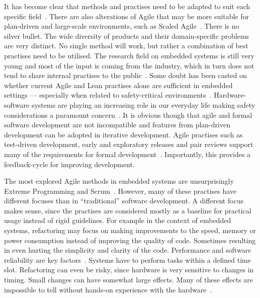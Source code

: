 \documentclass[english]{tktltiki2}
\begin{document}
It has become clear that methods and practises need to be adapted to suit each specific field~\cite{VB09, CWR10, HMP12, JLP12, KRM13}. There are also alterations of Agile that may be more suitable for plan-driven and large-scale environments, such as Scaled Agile~\cite{ScaledAgile}. There is no silver bullet. The wide diversity of products and their domain-specific problems are very distinct. No single method will work, but rather a combination of best practises need to be utilised. The research field on embedded systems is still very young and most of the input is coming from the industry, which in turn does not tend to share internal practises to the public~\cite{KRM13}. Some doubt has been casted on whether current Agile and Lean practises alone are sufficient in embedded settings — especially when related to safety-critical environments~\cite{TFR02, EB12}. Hardware-software systems are playing an increasing role in our everyday life making safety considerations a paramount concern~\cite{CWR10}. It is obvious though that agile and formal software development are not incompatible and features from plan-driven development can be adopted in iterative development. Agile practises such as test-driven development, early and exploratory releases and pair reviews support many of the requirements for formal development~\cite{TFR02, VB09, CWR10, JLP12}. Importantly, this provides a feedback-cycle for improving development.

The most explored Agile methods in embedded systems are unsurprisingly Extreme Programming and Scrum~\cite{KRM13}. However, many of these practises have different focuses than in “traditional” software development. A different focus makes sense, since the practises are considered mostly as a baseline for practical usage instead of rigid guidelines. For example in the context of embedded systems, refactoring may focus on making improvements to the speed, memory or power consumption instead of improving the quality of code. Sometimes resulting in even hurting the simplicity and clarity of the code. Performance and software reliability are key factors~\cite{RA03, EHS14}. Systems have to perform tasks within a defined time slot. Refactoring can even be risky, since hardware is very sensitive to changes in timing. Small changes can have somewhat large effects. Many of these effects are impossible to tell without hands-on experience with the hardware~\cite{RA03}.
\end{document}
